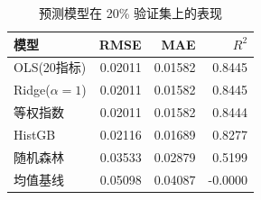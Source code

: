 \begin{table}[htbp]
\centering
\caption{预测模型在 20\% 验证集上的表现}
\label{tab:models}
\small
\begin{tabular}{lrrr}
\toprule
模型 & RMSE & MAE & $R^2$ \\
\midrule
OLS(20指标) & 0.02011 & 0.01582 & 0.8445 \\
Ridge($\alpha=1$) & 0.02011 & 0.01582 & 0.8445 \\
等权指数 & 0.02011 & 0.01582 & 0.8444 \\
HistGB & 0.02116 & 0.01689 & 0.8277 \\
随机森林 & 0.03533 & 0.02879 & 0.5199 \\
均值基线 & 0.05098 & 0.04087 & -0.0000 \\
\bottomrule
\end{tabular}
\end{table}
